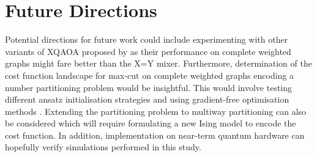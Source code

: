 \section{Future Directions} \label{sec:fd}
Potential directions for future work could include experimenting with other variants of XQAOA proposed by \citet{vijendran2023expressive} as their performance on complete weighted graphs might fare better than the X=Y mixer. Furthermore, determination of the cost function landscape for max-cut on complete weighted graphs encoding a number partitioning problem would be insightful. This would involve testing different ansatz initialisation strategies and using gradient-free optimisation methods \cite{cerezo2021cost}. Extending the partitioning problem to multiway partitioning \cite{korf2009multi} can also be considered which will require formulating a new Ising model to encode the cost function. In addition, implementation on near-term quantum hardware \cite{bengtsson2019quantum, zhou2020quantum} can hopefully verify simulations performed in this study.